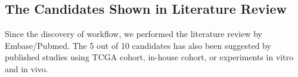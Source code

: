 \documentclass[jpm,article,submit,moreauthors,pdftex]{Definitions/mdpi}
\begin{document}
\begin{paracol}{2}
\subsection{The Candidates Shown in Literature Review}

Since the discovery of workflow, we performed the literature review by Embase/Pubmed.%
The 5 out of 10 candidates has also been suggested by published studies using TCGA cohort, in-house cohort, or experiments in vitro and in vivo.





\end{paracol}
\end{document}
